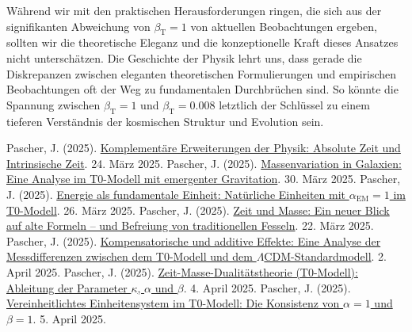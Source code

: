 \documentclass[12pt,a4paper]{article}
\newcommand{\betaT}{\beta_{\text{T}}}
\newcommand{\alphaEM}{\alpha_{\text{EM}}}
\begin{document}
	Während wir mit den praktischen Herausforderungen ringen, die sich aus der signifikanten Abweichung von \(\betaT = 1\) von aktuellen Beobachtungen ergeben, sollten wir die theoretische Eleganz und die konzeptionelle Kraft dieses Ansatzes nicht unterschätzen. Die Geschichte der Physik lehrt uns, dass gerade die Diskrepanzen zwischen eleganten theoretischen Formulierungen und empirischen Beobachtungen oft der Weg zu fundamentalen Durchbrüchen sind. So könnte die Spannung zwischen \(\betaT = 1\) und \(\betaT = 0.008\) letztlich der Schlüssel zu einem tieferen Verständnis der kosmischen Struktur und Evolution sein.
	
	\begin{thebibliography}{99}
		 Pascher, J. (2025). \href{https://github.com/jpascher/T0-Time-Mass-Duality/tree/main/2/pdf/Deutsch/KomplementPhysikZeit.pdf}{Komplementäre Erweiterungen der Physik: Absolute Zeit und Intrinsische Zeit}. 24. März 2025.
		 Pascher, J. (2025). \href{https://github.com/jpascher/T0-Time-Mass-Duality/tree/main/2/pdf/Deutsch/MassVarGalaxien.pdf}{Massenvariation in Galaxien: Eine Analyse im T0-Modell mit emergenter Gravitation}. 30. März 2025.
		 Pascher, J. (2025). \href{https://github.com/jpascher/T0-Time-Mass-Duality/tree/main/2/pdf/Deutsch/NatEinheitenAlpha1.pdf}{Energie als fundamentale Einheit: Natürliche Einheiten mit \(\alphaEM = 1\) im T0-Modell}. 26. März 2025.
		 Pascher, J. (2025). \href{https://github.com/jpascher/T0-Time-Mass-Duality/tree/main/2/pdf/Deutsch/ZeitMasseNeuerBlick.pdf}{Zeit und Masse: Ein neuer Blick auf alte Formeln – und Befreiung von traditionellen Fesseln}. 22. März 2025.
		 Pascher, J. (2025). \href{https://github.com/jpascher/T0-Time-Mass-Duality/tree/main/2/pdf/Deutsch/MessdifferenzenT0Standard.pdf}{Kompensatorische und additive Effekte: Eine Analyse der Messdifferenzen zwischen dem T0-Modell und dem \(\Lambda\)CDM-Standardmodell}. 2. April 2025.
		 Pascher, J. (2025). \href{https://github.com/jpascher/T0-Time-Mass-Duality/tree/main/2/pdf/Deutsch/ZeitMasseT0Params.pdf}{Zeit-Masse-Dualitätstheorie (T0-Modell): Ableitung der Parameter \(\kappa\), \(\alpha\) und \(\beta\)}. 4. April 2025.
		 Pascher, J. (2025). \href{https://github.com/jpascher/T0-Time-Mass-Duality/tree/main/2/pdf/Deutsch/Alpha1Beta1Konsistenz.pdf}{Vereinheitlichtes Einheitensystem im T0-Modell: Die Konsistenz von \(\alpha = 1\) und \(\beta = 1\)}. 5. April 2025.

\end{thebibliography}
\end{document}
